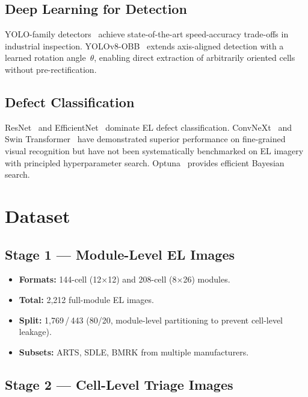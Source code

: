 \documentclass[conference]{IEEEtran}
\begin{document}
\subsection{Deep Learning for Detection}
YOLO-family detectors~\cite{redmon2016,jocher2023} achieve
state-of-the-art speed-accuracy trade-offs in industrial
inspection. YOLOv8-OBB~\cite{jocher2023} extends
axis-aligned detection with a learned rotation angle~$\theta$,
enabling direct extraction of arbitrarily oriented cells
without pre-rectification.

\subsection{Defect Classification}
ResNet~\cite{he2016} and EfficientNet~\cite{tan2019}
dominate EL defect classification.
ConvNeXt~\cite{liu2022} and Swin Transformer~\cite{liu2021}
have demonstrated superior performance on fine-grained visual
recognition but have not been systematically benchmarked on EL
imagery with principled hyperparameter search.
Optuna~\cite{akiba2019} provides efficient Bayesian search.

\section{Dataset}
\label{sec:dataset}

\subsection{Stage 1 --- Module-Level EL Images}

\begin{itemize}
  \item \textbf{Formats:} 144-cell (12$\times$12) and
        208-cell (8$\times$26) modules.
  \item \textbf{Total:} 2{,}212 full-module EL images.
  \item \textbf{Split:} 1{,}769\,/\,443 (80/20,
        module-level partitioning to prevent cell-level leakage).
  \item \textbf{Subsets:} ARTS, SDLE, BMRK from multiple
        manufacturers.
\end{itemize}

\subsection{Stage 2 --- Cell-Level Triage Images}
\end{document}
